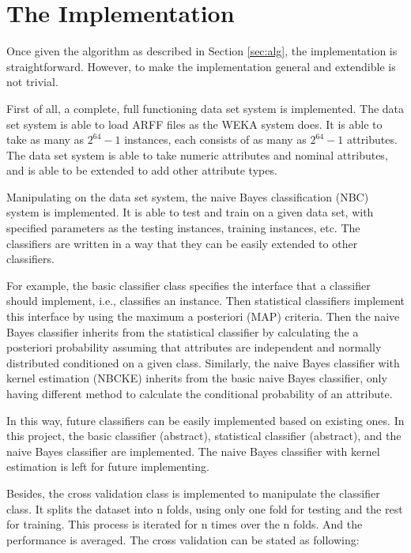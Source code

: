 \documentclass[a4paper,12pt]{article}
\begin{document}
\section{The Implementation}
\label{sec:imp}
Once given the algorithm as described in Section \ref{sec:alg}, the implementation is straightforward. However, to make the implementation general and extendible is not trivial.

First of all, a complete, full functioning data set system is implemented. The data set system is able to load ARFF files as the WEKA system does. It is able to take as many as $2^{64}-1$ instances, each consists of as many as $2^{64}-1$ attributes. The data set system is able to take numeric attributes and nominal attributes, and is able to be extended to add other attribute types. 

Manipulating on the data set system, the naive Bayes classification (NBC) system is implemented. It is able to test and train on a given data set, with specified parameters as the testing instances, training instances, etc. The classifiers are written in a way that they can be easily extended to other classifiers. 

For example, the basic classifier class specifies the interface that a classifier should implement, i.e., classifies an instance. Then statistical classifiers implement this interface by using the maximum a posteriori (MAP) criteria. Then the naive Bayes classifier inherits from the statistical classifier by calculating the a posteriori probability assuming that attributes are independent and normally distributed conditioned on a given class. Similarly, the naive Bayes classifier with kernel estimation (NBCKE) inherits from the basic naive Bayes classifier, only having different method to calculate the conditional probability of an attribute. 

In this way, future classifiers can be easily implemented based on existing ones. In this project, the basic classifier (abstract), statistical classifier (abstract), and the naive Bayes classifier are implemented. The naive Bayes classifier with kernel estimation is left for future implementing.

Besides, the cross validation class is implemented to manipulate the classifier class. It splits the dataset into n folds, using only one fold for testing and the rest for training. This process is iterated for n times over the n folds. And the performance is averaged. The cross validation can be stated as following:
\end{document}
